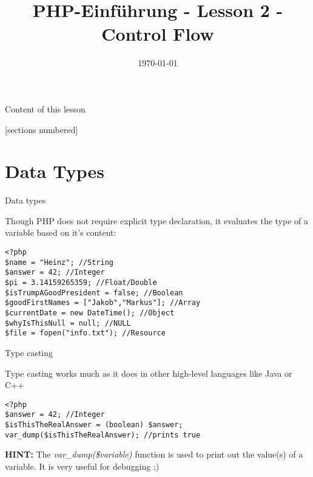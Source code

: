 


\newcommand{\topic}{
	PHP-Einführung - Lesson 2 - Control Flow
}

\title{\topic}
\date{\today}



\maketitle

\begin{frame}{Content of this lesson}

	[sections numbered]
	\tableofcontents

\end{frame}

\section{Data Types}

\begin{frame}[fragile]{Data types}

	Though PHP does not require explicit type declaration, it evaluates the type of a variable based on it's content: \pause
	\begin{lstlisting}
<?php
$name = "Heinz"; //String
$answer = 42; //Integer
$pi = 3.14159265359; //Float/Double
$isTrumpAGoodPresident = false; //Boolean
$goodFirstNames = ["Jakob","Markus"]; //Array
$currentDate = new DateTime(); //Object
$whyIsThisNull = null; //NULL
$file = fopen("info.txt"); //Resource
	\end{lstlisting}

\end{frame}

\begin{frame}[fragile]{Type casting}

	Type casting works much as it does in other high-level languages like Java or C++\pause
	\begin{lstlisting}
<?php
$answer = 42; //Integer
$isThisTheRealAnswer = (boolean) $answer; 
var_dump($isThisTheRealAnswer); //prints true
	\end{lstlisting}
	\pause
	
	\textbf{HINT:} The \emph{var\_{}dump(\$variable)} function is used to print out the value(s) of a variable. It is very useful for debugging ;)

\end{frame}

